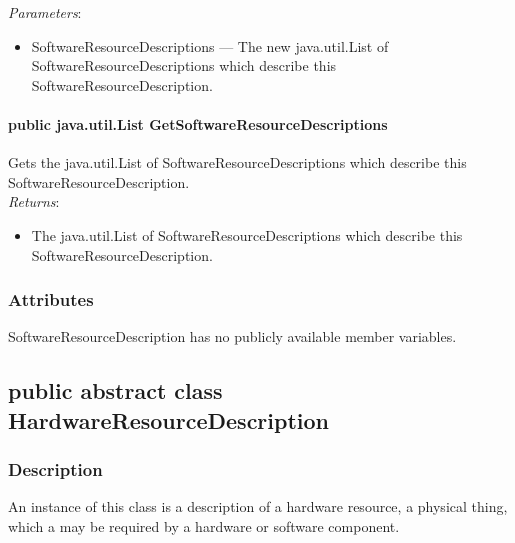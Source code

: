 \documentclass[$Date: 2003/06/26 19:29:31 $]{glabarticle}
\begin{document}
\textit{Parameters}:
\begin{itemize}
\item[] SoftwareResourceDescriptions --- The new java.util.List of SoftwareResourceDescriptions which describe 
this SoftwareResourceDescription.
\end{itemize}

\paragraph{public java.util.List GetSoftwareResourceDescriptions}

Gets the java.util.List of SoftwareResourceDescriptions which describe this SoftwareResourceDescription. \\

\textit{Returns}:
\begin{itemize}
\item[] The java.util.List of SoftwareResourceDescriptions which describe this 
SoftwareResourceDescription.
\end{itemize}


\subsubsection{Attributes}

SoftwareResourceDescription has no publicly available member variables. 


\newpage

\subsection{public abstract class HardwareResourceDescription}


\subsubsection{Description}

An instance of this class is a description of a hardware resource, a
physical thing, which a may be required by a hardware or software
component. \\
\end{document}
